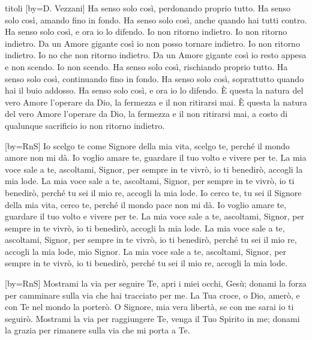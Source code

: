 \begin{songs}{titoli}
[by={D. Vezzani}]
\beginverse
Ha senso solo così, perdonando proprio tutto.
Ha senso solo così, amando fino in fondo.
Ha senso solo così, anche quando hai tutti contro.
Ha senso solo così, e ora io lo difendo.
\endverse
\beginchorus
Io non ritorno indietro. Io non ritorno indietro.
Da un Amore gigante così io non posso tornare indietro.
Io non ritorno indietro. Io no che non ritorno indietro.
Da un Amore gigante così io resto appesa e non scendo.
Io non scendo.
\endchorus
\beginverse
Ha senso solo così, rischiando proprio tutto.
Ha senso solo così, continuando fino in fondo.
Ha senso solo così, soprattutto quando hai il buio addosso.
Ha senso solo così, e ora io lo difendo.
\endverse
\beginverse
È questa la natura del vero Amore
l'operare da Dio, la fermezza e il non ritirarsi mai.
È questa la natura del vero Amore
l'operare da Dio, la fermezza e il non ritirarsi mai,
a costo di qualunque sacrificio io non ritorno indietro.
\endverse
\endsong

[by={RnS}]
\beginverse
Io scelgo te
come Signore della mia vita, scelgo te,
perché il mondo amore non mi dà.
Io voglio amare te,
guardare il tuo volto e vivere per te.
\endverse
\beginchorus
La mia voce sale a te, ascoltami, Signor,
per sempre in te vivrò, io ti benedirò,
accogli la mia lode.
La mia voce sale a te, ascoltami, Signor,
per sempre in te vivrò, io ti benedirò,
perché tu sei il mio re, accogli la mia lode.
\endchorus
\beginverse
Io cerco te,
tu sei il Signore della mia vita, cerco te,
perché il mondo pace non mi dà.
Io voglio amare te,
guardare il tuo volto e vivere per te.
\endverse
\beginchorus
La mia voce sale a te, ascoltami, Signor,
per sempre in te vivrò, io ti benedirò,
accogli la mia lode.
La mia voce sale a te, ascoltami, Signor,
per sempre in te vivrò, io ti benedirò,
perché tu sei il mio re, accogli la mia lode, mio Signor.
La mia voce sale a te, ascoltami, Signor,
per sempre in te vivrò, io ti benedirò,
perché tu sei il mio re, accogli la mia lode.
\endchorus
\endsong

[by={RnS}]
\beginverse
Mostrami la via per seguire Te, apri i miei occhi, Gesù;
donami la forza per camminare sulla via che hai tracciato per me.
\endverse
\beginchorus
La Tua croce, o Dio, amerò, e con Te nel mondo la porterò.
O Signore, mia vera libertà, se con me sarai io ti seguirò.
\endchorus
\beginverse
Mostrami la via per raggiungere Te, venga il Tuo Spirito in me;
donami la grazia per rimanere sulla via che mi porta a Te.
\endverse
\endsong


\end{songs}
